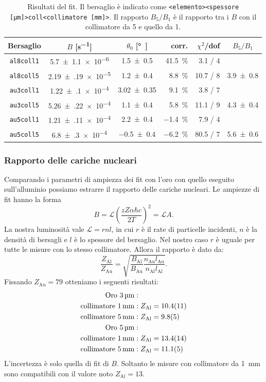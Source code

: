 \begin{table}
	\centering
	\begin{tabular}{cccrrc}
		Bersaglio & $B$ [\si{s^{-1}}] & $\theta_0$ [\si\degree] & corr. & $\chi^2$/dof & $B_5/B_1$ \\
		\hline
		\texttt{al8coll1} & \num{5.7(11)e-6 } & \num{1.5 \pm 0.5  } & \SI{41.5} \% & 3.1 / 4  & \\
		\texttt{al8coll5} & \num{2.19(19)e-5} & \num{1.2 \pm 0.4  } & \SI{8.8 }\%  & 10.7 / 8 & \num{3.9 \pm 0.8} \\
		\texttt{au3coll1} & \num{1.22(10)e-4} & \num{3.02 \pm 0.35} & \SI{9.1 }\%  & 3.8 / 7  & \\
		\texttt{au3coll5} & \num{5.26(22)e-4} & \num{1.1 \pm 0.4  } & \SI{5.8 }\%  & 11.1 / 9 & \num{4.3 \pm 0.4} \\
		\texttt{au5coll1} & \num{1.21(11)e-4} & \num{2.2 \pm 0.4  } & \SI{-1.4} \% & 7.9 / 4  & \\
		\texttt{au5coll5} & \num{6.8(3)e-4  } & \num{-0.5 \pm 0.4 } & \SI{-6.2} \% & 80.5 / 7 & \num{5.6 \pm 0.6} 
	\end{tabular}
	\caption{\label{tab:fit}
	Risultati del fit. Il bersaglio è indicato come
	\texttt{<elemento><spessore [\si{\micro m}]>coll<collimatore [\si{mm}]>}.
	Il rapporto $B_5/B_1$ è il rapporto tra i $B$ con il collimatore da 5 e quello da 1.}
\end{table}

\subsubsection{Rapporto delle cariche nucleari}

Comparando i parametri di ampiezza dei fit con l'oro con quello eseguito sull'alluminio
possiamo estrarre il rapporto delle cariche nucleari.
Le ampiezze di fit hanno la forma
$$ B=\mathcal{L} \left( \frac {zZ\alpha\hbar c} {2T} \right)^2 = \mathcal{L} A. $$
La nostra luminosità vale $\mathcal{L}=r n l$, in cui $r$ è il rate di particelle incidenti, $n$  è la densità di bersagli e $l$ è lo spessore del bersaglio.
Nel nostro caso $r$ è uguale per tutte le misure con lo stesso collimatore.
Allora il rapporto è dato da:
\begin{equation*}
\frac {Z_{\text{Al}}} {Z_{\text{Au}}}
= \sqrt{ \frac{B_{\text{Al}}}{B_{\text{Au}}} \frac{n_{\text{Au}} l_{\text{Au}}}{n_{\text{Al}} l_{\text{Al}}} }.
\end{equation*}
Fissando $Z_\text{Au}=79$ otteniamo i seguenti risultati:
\begin{align*}
\text{Oro } \SI3{\micro m}&:\\
\text{collimatore } \SI1{mm}&: Z_{\text{Al}}=\num{10.4\pm1.1} \\
\text{collimatore } \SI5{mm}&: Z_{\text{Al}}=\num{9.8\pm0.5} \\
\text{Oro } \SI5{\micro m}&:\\           
\text{collimatore } \SI1{mm}&: Z_{\text{Al}}=\num{13.4\pm1.4} \\
\text{collimatore } \SI5{mm}&: Z_{\text{Al}}=\num{11.1\pm0.5} \\
\end{align*}
L'incertezza è solo quella di fit di $B$.
Soltanto le misure con collimatore da \SI{1}{mm} sono compatibili con il valore noto $Z_\text{Al}=13$.